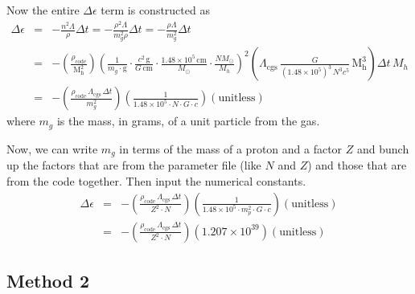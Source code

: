 Now the entire $\Delta \epsilon$ term is constructed as
\begin{subequations}
\begin{eqnarray}
    \Delta \epsilon &=& - \frac{n^2 \Lambda}{\rho} \Delta t = - \frac{\rho^2 \Lambda}{m_g^2 \rho} \Delta t = - \frac{\rho \Lambda}{m_g^2} \Delta t \\
	&=& - \left( \frac{\rho_\mathrm{code}}{\mathrm{M_h^2}} \right) 
	\left( \frac{1}{m_g \cdot \mathrm{g}}\cdot\frac{c^2 \, \mathrm{g}}{G\, \mathrm{cm}} \cdot \frac{1.48\times 10^5\,\mathrm{cm}}{M_\odot}\cdot \frac{N M_\odot}{M_h} \right)^2
	\left( \Lambda_\mathrm{cgs}\,\frac{G}{(1.48\times 10^5)^3\,N^3 c^5}\,\mathrm{M_h^3} \right) \Delta t\,M_h \\
	&=& - \left( \frac{ \rho_\mathrm{code}\,\Lambda_\mathrm{cgs}\, \Delta t}{m_g^2} \right) 
		\left( \frac{1}{1.48\times 10^5\cdot N\cdot G\cdot c} \right) \left(\mathrm{unitless}\right)
\end{eqnarray}
\end{subequations}
where $m_g$ is the mass, in grams, of a unit particle from the gas.

Now, we can write $m_g$ in terms of the mass of a proton and a factor $Z$ 
and bunch up the factors that are from the parameter file (like $N$ and $Z$) 
and those that are from the code together.  Then input the numerical constants.
\begin{subequations}
\begin{eqnarray}
    \Delta \epsilon &=& - \left( \frac{ \rho_\mathrm{code}\,\Lambda_\mathrm{cgs}\, \Delta t}{Z^2\cdot N} \right) 
                \left( \frac{1}{1.48\times 10^5\cdot m_p^2\cdot G\cdot c} \right) \left(\mathrm{unitless}\right) \\
    &=& - \left( \frac{ \rho_\mathrm{code}\,\Lambda_\mathrm{cgs}\, \Delta t}{Z^2\cdot N} \right) 
                \left( 1.207\times 10^{39} \right) \left(\mathrm{unitless}\right)
\end{eqnarray}
\end{subequations}

\subsection{Method 2}

